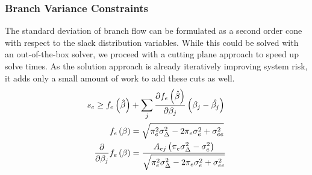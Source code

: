 \subsubsection*{Branch Variance Constraints}
The standard deviation of branch flow can be formulated as a second order cone with respect to the slack distribution variables.  While this could be solved with an out-of-the-box solver, we proceed with a cutting plane approach to speed up solve times.  As the solution approach is already iteratively improving system risk, it adds only a small amount of work to add these cuts as well.
\begin{subequations}
\label{branch_var_cuts}
\begin{align}
s_e \geq f_e\left(\hat{\beta}\right) &+ \sum_j \frac{\partial f_e\left(\hat{\beta} \right)}{\partial \beta_j} \left( \beta_j - \hat{\beta_j} \right)\\
  f_e\left(\beta\right) &= \sqrt{\pi_e^2 \sigma_\Delta^2 - 2 \pi_e \sigma_e^2  + \sigma_{ee}^2 }\\
  \frac{\partial}{\partial \beta_j}f_e\left(\beta\right) &= \frac{A_{ej} \left( \pi_e \sigma_\Delta^2 - \sigma_e^2 \right)}{\sqrt{\pi_e^2 \sigma_\Delta^2 - 2 \pi_e \sigma_e^2  + \sigma_{ee}^2 }}
\end{align}
\end{subequations}


